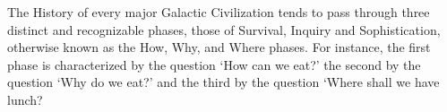\label{chapter:introduction}

The History of every major Galactic Civilization tends to pass through three distinct and recognizable phases, those of Survival, Inquiry and Sophistication, otherwise known as the How, Why, and Where phases. For instance, the first phase is characterized by the question `How can we eat?' the second by the question `Why do we eat?' and the third by the question `Where shall we have lunch?\cite{adams1995hitchhiker}